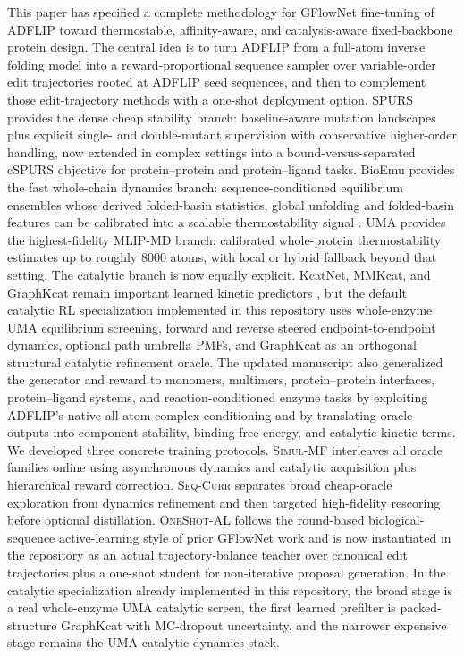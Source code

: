 \documentclass[11pt]{article}
\newcommand{\methodI}{\textsc{Simul-MF}}
\newcommand{\methodII}{\textsc{Seq-Curr}}
\newcommand{\methodIII}{\textsc{OneShot-AL}}
\begin{document}
	This paper has specified a complete methodology for GFlowNet fine-tuning of ADFLIP toward thermostable, affinity-aware, and catalysis-aware fixed-backbone protein design. The central idea is to turn ADFLIP from a full-atom inverse folding model into a reward-proportional sequence sampler over variable-order edit trajectories rooted at ADFLIP seed sequences, and then to complement those edit-trajectory methods with a one-shot deployment option. SPURS provides the dense cheap stability branch: baseline-aware mutation landscapes plus explicit single- and double-mutant supervision with conservative higher-order handling, now extended in complex settings into a bound-versus-separated cSPURS objective for protein--protein and protein--ligand tasks. BioEmu provides the fast whole-chain dynamics branch: sequence-conditioned equilibrium ensembles whose derived folded-basin statistics, global unfolding and folded-basin features can be calibrated into a scalable thermostability signal \citep{lewis2024bioemu}. UMA provides the highest-fidelity MLIP-MD branch: calibrated whole-protein thermostability estimates up to roughly $8000$ atoms, with local or hybrid fallback beyond that setting. The catalytic branch is now equally explicit. KcatNet, MMKcat, and GraphKcat remain important learned kinetic predictors \citep{pan2026kcatnet,luo2025graphkcat,sun2025mmkcat}, but the default catalytic RL specialization implemented in this repository uses whole-enzyme UMA equilibrium screening, forward and reverse steered endpoint-to-endpoint dynamics, optional path umbrella PMFs, and GraphKcat as an orthogonal structural catalytic refinement oracle. The updated manuscript also generalized the generator and reward to monomers, multimers, protein--protein interfaces, protein--ligand systems, and reaction-conditioned enzyme tasks by exploiting ADFLIP's native all-atom complex conditioning and by translating oracle outputs into component stability, binding free-energy, and catalytic-kinetic terms. We developed three concrete training protocols. \methodI{} interleaves all oracle families online using asynchronous dynamics and catalytic acquisition plus hierarchical reward correction. \methodII{} separates broad cheap-oracle exploration from dynamics refinement and then targeted high-fidelity rescoring before optional distillation. \methodIII{} follows the round-based biological-sequence active-learning style of prior GFlowNet work and is now instantiated in the repository as an actual trajectory-balance teacher over canonical edit trajectories plus a one-shot student for non-iterative proposal generation. In the catalytic specialization already implemented in this repository, the broad stage is a real whole-enzyme UMA catalytic screen, the first learned prefilter is packed-structure GraphKcat with MC-dropout uncertainty, and the narrower expensive stage remains the UMA catalytic dynamics stack.
	
\end{document}
